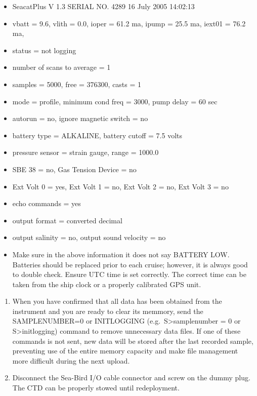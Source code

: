 \documentclass[]{book}
\providecommand{\tightlist}{%
  \setlength{\itemsep}{0pt}\setlength{\parskip}{0pt}}
\begin{document}
\begin{enumerate}
  \begin{itemize}
  \tightlist
  \item
    SeacatPlus V 1.3 SERIAL NO. 4289 16 July 2005 14:02:13
  \item
    vbatt = 9.6, vlith = 0.0, ioper = 61.2 ma, ipump = 25.5 ma, iext01 = 76.2 ma,
  \item
    status = not logging
  \item
    number of scans to average = 1
  \item
    samples = 5000, free = 376300, casts = 1
  \item
    mode = profile, minimum cond freq = 3000, pump delay = 60 sec
  \item
    autorun = no, ignore magnetic switch = no
  \item
    battery type = ALKALINE, battery cutoff = 7.5 volts
  \item
    pressure sensor = strain gauge, range = 1000.0
  \item
    SBE 38 = no, Gas Tension Device = no
  \item
    Ext Volt 0 = yes, Ext Volt 1 = no, Ext Volt 2 = no, Ext Volt 3 = no
  \item
    echo commands = yes
  \item
    output format = converted decimal
  \item
    output salinity = no, output sound velocity = no
  \end{itemize}
\end{enumerate}

\begin{itemize}
\tightlist
\item
  Make sure in the above information it does not say BATTERY LOW. Batteries should be replaced prior to each cruise; however, it is always good to double check. Ensure UTC time is set correctly. The correct time can be taken from the ship clock or a properly calibrated GPS unit.
\end{itemize}

\begin{enumerate}
\def\labelenumi{\arabic{enumi}.}
\setcounter{enumi}{4}
\tightlist
\item
  When you have confirmed that all data has been obtained from the instrument and you are ready to clear its memmory, send the SAMPLENUMBER=0 or INITLOGGING (e.g.~S\textgreater samplenumber = 0 or S\textgreater initlogging) command to remove unnecessary data files. If one of these commands is not sent, new data will be stored after the last recorded sample, preventing use of the entire memory capacity and make file management more difficult during the next upload.
\item
  Disconnect the Sea-Bird I/O cable connector and screw on the dummy plug. The CTD can be properly stowed until redeployment.
\end{enumerate}
\end{document}
